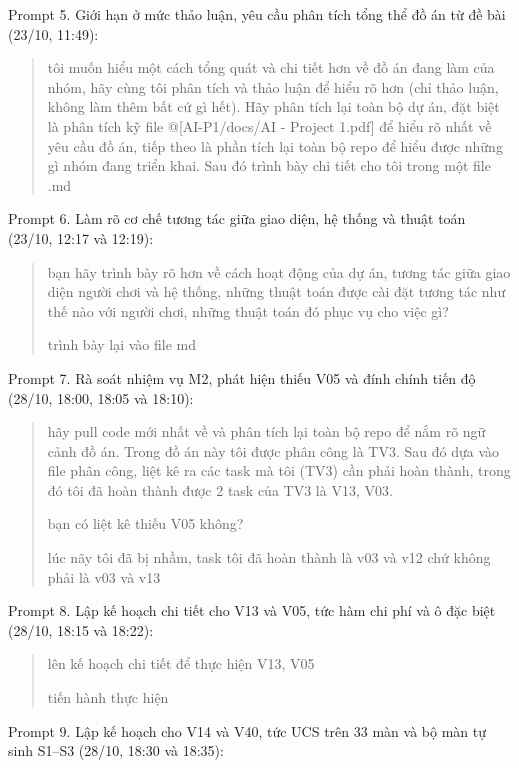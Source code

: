 Prompt 5. Giới hạn ở mức thảo luận, yêu cầu phân tích tổng thể đồ án từ đề bài (23/10, 11:49):

\begin{quote}
tôi muốn hiểu một cách tổng quát và chi tiết hơn về đồ án đang làm của nhóm, hãy cùng tôi phân tích và thảo luận để hiểu rõ hơn (chỉ thảo luận, không làm thêm bất cứ gì hết). Hãy phân tích lại toàn bộ dự án, đặt biệt là phân tích kỹ file @{[}AI-P1/docs/AI - Project 1.pdf{]} để hiểu rõ nhất về yêu cầu đồ án, tiếp theo là phần tích lại toàn bộ repo để hiểu được những gì nhóm đang triển khai. Sau đó trình bày chi tiết cho tôi trong một file .md
\end{quote}

Prompt 6. Làm rõ cơ chế tương tác giữa giao diện, hệ thống và thuật toán (23/10, 12:17 và 12:19):

\begin{quote}
bạn hãy trình bày rõ hơn về cách hoạt động của dự án, tương tác giữa giao diện người chơi và hệ thống, những thuật toán được cài đặt tương tác như thế nào với người chơi, những thuật toán đó phục vụ cho việc gì?

trình bày lại vào file md
\end{quote}

Prompt 7. Rà soát nhiệm vụ M2, phát hiện thiếu V05 và đính chính tiến độ (28/10, 18:00, 18:05 và 18:10):

\begin{quote}
hãy pull code mới nhất về và phân tích lại toàn bộ repo để nắm rõ ngữ cảnh đồ án. Trong đồ án này tôi được phân công là TV3. Sau đó dựa vào file phân công, liệt kê ra các task mà tôi (TV3) cần phải hoàn thành, trong đó tôi đã hoàn thành được 2 task của TV3 là V13, V03.

bạn có liệt kê thiếu V05 không?

lúc nãy tôi đã bị nhầm, task tôi đã hoàn thành là v03 và v12 chứ không phải là v03 và v13
\end{quote}

Prompt 8. Lập kế hoạch chi tiết cho V13 và V05, tức hàm chi phí và ô đặc biệt (28/10, 18:15 và 18:22):

\begin{quote}
lên kế hoạch chi tiết để thực hiện V13, V05

tiến hành thực hiện
\end{quote}

Prompt 9. Lập kế hoạch cho V14 và V40, tức UCS trên 33 màn và bộ màn tự sinh S1--S3 (28/10, 18:30 và 18:35):

